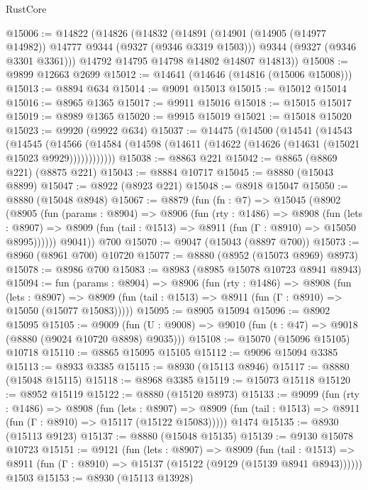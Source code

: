 \begin{lexlean}{RustCore}
\begin{coremodule}
@15006 := @14822
    (@14826
      (@14832
        (@14891
          (@14901 (@14905 (@14977 @14982)) @14777 @9344 (@9327 (@9346 @3319 @1503)))
          @9344
          (@9327 (@9346 @3301 @3361)))
        @14792
        @14795
        @14798
        @14802
        @14807
        @14813))
@15008 := @9899 @12663 @2699
@15012 := @14641 (@14646 (@14816 (@15006 @15008)))
@15013 := @8894 @634
@15014 := @9091 @15013
@15015 := @15012 @15014
@15016 := @8965 @1365
@15017 := @9911 @15016
@15018 := @15015 @15017
@15019 := @8989 @1365
@15020 := @9915 @15019
@15021 := @15018 @15020
@15023 := @9920 (@9922 @634)
@15037 := @14475
    (@14500
      (@14541
        (@14543
          (@14545
            (@14566 (@14584 (@14598 (@14611 (@14622 (@14626 (@14631 (@15021 @15023 @9929))))))))))))
@15038 := @8863 @221
@15042 := @8865 (@8869 @221) (@8875 @221)
@15043 := @8884 @10717
@15045 := @8880 (@15043 @8899)
@15047 := @8922 (@8923 @221)
@15048 := @8918 @15047
@15050 := @8880 (@15048 @8948)
@15067 := @8879
    (fun (fn : @7) =>
    @15045
      (@8902
        (@8905
          (fun (params : @8904) =>
          @8906
            (fun (rty : @1486) =>
            @8908
              (fun (lets : @8907) =>
              @8909 (fun (tail : @1513) => @8911 (fun (Γ : @8910) => @15050 @8995))))))
        @9041))
    @700
@15070 := @9047 (@15043 (@8897 @700))
@15073 := @8960 (@8961 @700) @10720
@15077 := @8880 (@8952 (@15073 @8969) @8973)
@15078 := @8986 @700
@15083 := @8983 (@8985 @15078 @10723 @8941 @8943)
@15094 := fun (params : @8904) =>
  @8906
    (fun (rty : @1486) =>
    @8908
      (fun (lets : @8907) =>
      @8909 (fun (tail : @1513) => @8911 (fun (Γ : @8910) => @15050 (@15077 @15083)))))
@15095 := @8905 @15094
@15096 := @8902 @15095
@15105 := @9009
    (fun (U : @9008) => @9010 (fun (t : @47) => @9018 (@8880 (@9024 @10720 @8898) @9035)))
@15108 := @15070 (@15096 @15105) @10718
@15110 := @8865 @15095 @15105
@15112 := @9096 @15094 @3385
@15113 := @8933 @3385
@15115 := @8930 (@15113 @8946)
@15117 := @8880 (@15048 @15115)
@15118 := @8968 @3385
@15119 := @15073 @15118
@15120 := @8952 @15119
@15122 := @8880 (@15120 @8973)
@15133 := @9099
    (fun (rty : @1486) =>
    @8908
      (fun (lets : @8907) =>
      @8909 (fun (tail : @1513) => @8911 (fun (Γ : @8910) => @15117 (@15122 @15083)))))
    @1474
@15135 := @8930 (@15113 @9123)
@15137 := @8880 (@15048 @15135)
@15139 := @9130 @15078 @10723
@15151 := @9121
    (fun (lets : @8907) =>
    @8909
      (fun (tail : @1513) =>
      @8911 (fun (Γ : @8910) => @15137 (@15122 (@9129 (@15139 @8941 @8943))))))
    @1503
@15153 := @8930 (@15113 @13928)

\end{coremodule}
\end{lexlean}

